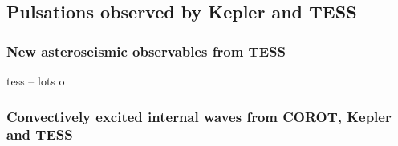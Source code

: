 {\color{blue}
\subsection{Pulsations observed by Kepler and TESS}



\subsubsection{New asteroseismic observables from TESS}

tess -- lots o

\subsubsection{Convectively excited internal waves from COROT, Kepler and TESS}


}